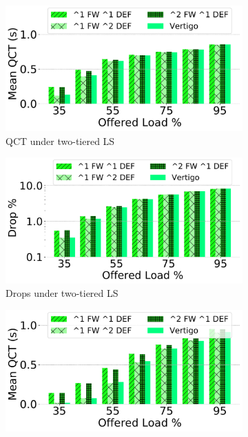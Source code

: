 \begin{figure}[t]
	\centering
		\begin{subfigure}[t]{.49\linewidth}
    	\centering
		\includegraphics[width=0.99\linewidth]{figs/powerofx25.pdf}
    	\caption{\small{QCT under two-tiered LS}}
    	\label{fig:lb-qct-ls}
	\end{subfigure}
	\hfill{}
	\begin{subfigure}[t]{.49\linewidth}
    	\centering
		\includegraphics[width=0.99\linewidth]{figs/powerofxdrops25.pdf}
    	\caption{\small{Drops under two-tiered LS}}
    	\label{fig:lbdrops-ls}
	\end{subfigure}
	\begin{subfigure}[t]{.49\linewidth}
    	\centering
		\includegraphics[width=0.99\linewidth]{figs/powerofx25fattree.pdf}

\end{subfigure}
\end{figure}
